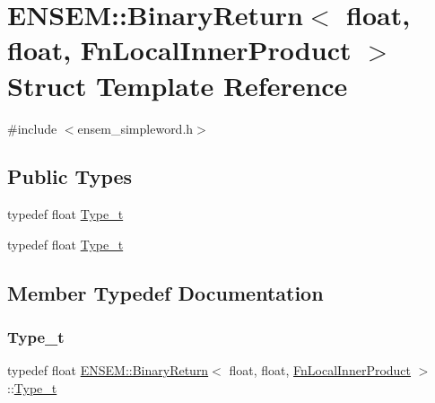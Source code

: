 \hypertarget{structENSEM_1_1BinaryReturn_3_01float_00_01float_00_01FnLocalInnerProduct_01_4}{}\section{E\+N\+S\+EM\+:\+:Binary\+Return$<$ float, float, Fn\+Local\+Inner\+Product $>$ Struct Template Reference}
\label{structENSEM_1_1BinaryReturn_3_01float_00_01float_00_01FnLocalInnerProduct_01_4}


{\ttfamily \#include $<$ensem\+\_\+simpleword.\+h$>$}

\subsection*{Public Types}
\begin{DoxyCompactItemize}
\item 
typedef float \mbox{\hyperlink{structENSEM_1_1BinaryReturn_3_01float_00_01float_00_01FnLocalInnerProduct_01_4_ad3f2d521df09966c47e84ff9e4dc2a95}{Type\+\_\+t}}
\item 
typedef float \mbox{\hyperlink{structENSEM_1_1BinaryReturn_3_01float_00_01float_00_01FnLocalInnerProduct_01_4_ad3f2d521df09966c47e84ff9e4dc2a95}{Type\+\_\+t}}
\end{DoxyCompactItemize}


\subsection{Member Typedef Documentation}
\mbox{\label{structENSEM_1_1BinaryReturn_3_01float_00_01float_00_01FnLocalInnerProduct_01_4_ad3f2d521df09966c47e84ff9e4dc2a95}} 
\subsubsection{\texorpdfstring{Type\_t}{Type\_t}\hspace{0.1cm}{\footnotesize\ttfamily [1/2]}}
{\footnotesize\ttfamily typedef float \mbox{\hyperlink{structENSEM_1_1BinaryReturn}{E\+N\+S\+E\+M\+::\+Binary\+Return}}$<$ float, float, \mbox{\hyperlink{structENSEM_1_1FnLocalInnerProduct}{Fn\+Local\+Inner\+Product}} $>$\+::\mbox{\hyperlink{structENSEM_1_1BinaryReturn_3_01float_00_01float_00_01FnLocalInnerProduct_01_4_ad3f2d521df09966c47e84ff9e4dc2a95}{Type\+\_\+t}}}

